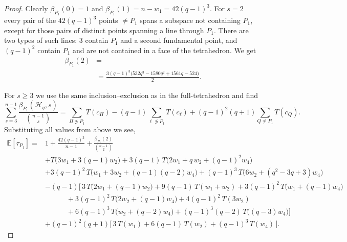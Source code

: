 \documentclass{article}
\newcommand{\E}{\mathbb{E}}
\begin{document}
\begin{proof}
Clearly $\beta_{P_1}(0)=1$ and $\beta_{P_1}(1)=n-w_1=42(q-1)^3$.
For $s=2$ every pair of the $42(q-1)^3$ points $\ne P_1$ spans a subspace not containing
$P_1$, except for those pairs of distinct points spanning a line through $P_1$. There are two types of such lines: $3$ contain $P_1$ and a second fundamental point, and $(q-1)^2$ contain $P_1$ and are not contained in a face of the tetrahedron. We get
\begin{align*}
\beta_{P_1}(2)
&= \\&=\frac{3(q-1)^3\bigl(532q^3-1580q^2+1561q-524\bigr)}{2}.
\end{align*}

For $s\ge3$ we use the same
inclusion--exclusion as in the full-tetrahedron and find
\[
\sum_{s=3}^{n-1}\frac{\beta_{P_1}(\mathcal H_q,s)}{\binom{n-1}{s}}
 =\sum_{\Pi\not\ni P_1}T(c_\Pi)
 -(q-1)\sum_{\ell\not\ni P_1}T(c_\ell)
 +(q-1)^2(q+1)\sum_{Q\ne P_1}T(c_Q).
\]
Substituting all values from above we see,
\[
\begin{aligned}
\E[\tau_{P_1}]
={}&1+\frac{42(q-1)^3}{n-1}+\frac{\beta_{P_1}(2)}{\binom{n-1}{2}}\\
&+T\!\big(3w_1+3(q-1)w_2\big)
 +3(q-1)\,T\!\big(2w_1+q\,w_2+(q-1)^2w_4\big)\\
&+3(q-1)^2\,T\!\big(w_1+3w_2+(q-1)(q-2)w_4\big)
 +(q-1)^3\,T\!\big(6w_2+(q^2-3q+3)w_4\big)\\
&-(q-1)\Big[\,3\,T\!\big(2w_1+(q-1)w_2\big)+9(q-1)\,T(w_1+w_2)
      +3(q-1)^2\,T\!\big(w_1+(q-1)w_4\big)\\
&\qquad\quad +3(q-1)^2\,T\!\big(2w_2+(q-1)w_4\big)+4(q-1)^2\,T(3w_2)\\
&\qquad\quad +6(q-1)^3\,T\!\big(w_2+(q-2)w_4\big)
      +(q-1)^3(q-2)\,T\!\big((q-3)w_4\big)\Big]\\
&+(q-1)^2(q+1)\Big[\,3\,T(w_1)+6(q-1)\,T(w_2)+(q-1)^3\,T(w_4)\,\Big].
\end{aligned}
\]


\end{proof}
\end{document}
